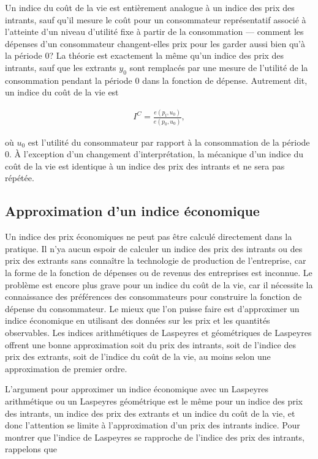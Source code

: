 \documentclass[]{article}
\begin{document}
Un indice du coût de la vie est entièrement analogue à un indice des prix des intrants, sauf qu'il mesure le coût pour un consommateur représentatif associé à l'atteinte d'un niveau d'utilité fixe à partir de la consommation --- comment les dépenses d'un consommateur changent-elles prix pour les garder aussi bien qu'à la période 0? La théorie est exactement la même qu'un indice des prix des intrants, sauf que les extrants \(y_0\) sont remplacés par une mesure de l'utilité de la consommation pendant la période 0 dans la fonction de dépense. Autrement dit, un indice du coût de la vie est

\begin{align*}
I^{C} = \frac{e (p_{t}, u_{0})}{e (p_{0}, u_{0})},
\end{align*}

où \(u_{0}\) est l'utilité du consommateur par rapport à la consommation de la période 0. À l'exception d'un changement d'interprétation, la mécanique d'un indice du coût de la vie est identique à un indice des prix des intrants et ne sera pas répétée.

\hypertarget{approximation-dun-indice-uxe9conomique}{%
\subsection{Approximation d'un indice économique}\label{approximation-dun-indice-uxe9conomique}}

Un indice des prix économiques ne peut pas être calculé directement dans la pratique. Il n'ya aucun espoir de calculer un indice des prix des intrants ou des prix des extrants sans connaître la technologie de production de l'entreprise, car la forme de la fonction de dépenses ou de revenus des entreprises est inconnue. Le problème est encore plus grave pour un indice du coût de la vie, car il nécessite la connaissance des préférences des consommateurs pour construire la fonction de dépense du consommateur. Le mieux que l'on puisse faire est d'approximer un indice économique en utilisant des données sur les prix et les quantités observables. Les indices arithmétiques de Laspeyres et géométriques de Laspeyres offrent une bonne approximation soit du prix des intrants, soit de l'indice des prix des extrants, soit de l'indice du coût de la vie, au moins selon une approximation de premier ordre.

L'argument pour approximer un indice économique avec un Laspeyres arithmétique ou un Laspeyres géométrique est le même pour un indice des prix des intrants, un indice des prix des extrants et un indice du coût de la vie, et donc l'attention se limite à l'approximation d'un prix des intrants indice. Pour montrer que l'indice de Laspeyres se rapproche de l'indice des prix des intrants, rappelons que
\end{document}
